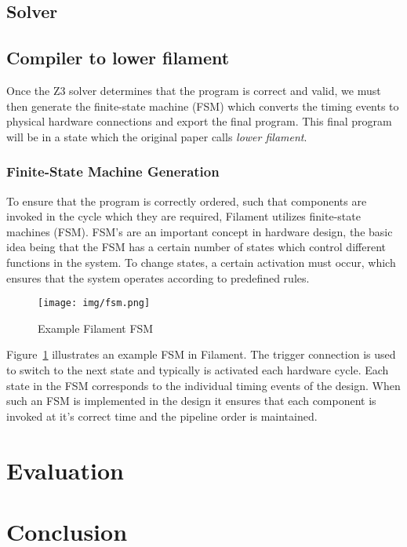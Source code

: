 \documentclass[12pt,a4paper]{article}
\begin{document}
\subsection{Solver}

\subsection{Compiler to lower filament}
Once the Z3 solver determines that the program is correct and valid, we must then generate the finite-state machine (FSM) which converts the timing events to physical hardware connections and export the final program. This final program will be in a state which the original paper calls \emph{lower filament}.

\subsubsection{Finite-State Machine Generation}
To ensure that the program is correctly ordered, such that components are invoked in the cycle which they are required, Filament utilizes finite-state machines (FSM). FSM's are an important concept in hardware design, the basic idea being that the FSM has a certain number of states which control different functions in the system. To change states, a certain activation must occur, which ensures that the system operates according to predefined rules.

\begin{figure}[htbp]
    \centering
    \texttt{[image: img/fsm.png]}
    \caption{Example Filament FSM}
    \label{fig:fsm}
\end{figure}

Figure~\ref{fig:fsm} illustrates an example FSM in Filament. The trigger connection is used to switch to the next state and typically is activated each hardware cycle. Each state in the FSM corresponds to the individual timing events of the design. When such an FSM is implemented in the design it ensures that each component is invoked at it's correct time and the pipeline order is maintained.

\section{Evaluation}

\section{Conclusion}



\medskip

\printbibliography
\end{document}
